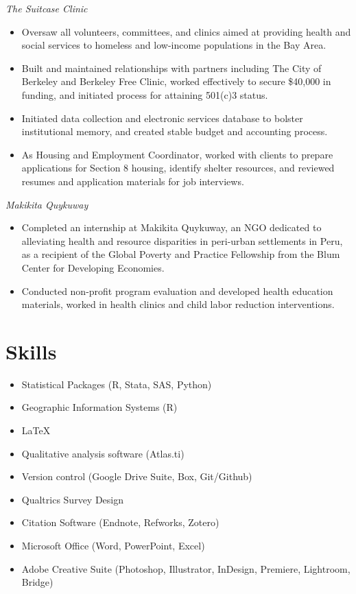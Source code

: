 \documentclass{cv_style}
\begin{document}
\textit{The Suitcase Clinic}
\begin{itemize}
    \item Oversaw all volunteers, committees, and clinics aimed at providing health and social services to homeless and low-income populations in the Bay Area.
    \item \parskip 1pt Built and maintained relationships with partners including The City of Berkeley and Berkeley Free Clinic, worked effectively to secure \$40,000 in funding, and initiated process for attaining 501(c)3 status.
    \item \parskip 1pt Initiated data collection and electronic services database to bolster institutional memory, and created stable budget and accounting process.
    \item \parskip 1pt As Housing and Employment Coordinator, worked with clients to prepare applications for Section 8 housing, identify shelter resources, and reviewed resumes and application materials for job interviews. 
\end{itemize}


\textit{Makikita Quykuway}
\begin{itemize}
    \item Completed an internship at Makikita Quykuway, an NGO dedicated to alleviating health and resource disparities in peri-urban settlements in Peru, as a recipient of the Global Poverty and Practice Fellowship from the Blum Center for Developing Economies.
    \item \parskip 1pt Conducted non-profit program evaluation and developed health education materials, worked in health clinics and child labor reduction interventions.
\end{itemize}

\section{Skills}
\begin{itemize}
    \item Statistical Packages (R, Stata, SAS, Python)
    \item \parskip 1pt Geographic Information Systems (R)
    \item \parskip 1pt \LaTeX
    \item \parskip 1pt Qualitative analysis software (Atlas.ti)
    \item \parskip 1pt Version control (Google Drive Suite, Box, Git/Github)
    \item \parskip 1pt Qualtrics Survey Design
    \item \parskip 1pt Citation Software (Endnote, Refworks, Zotero)
    \item \parskip 1pt Microsoft Office (Word, PowerPoint, Excel)
    \item \parskip 1pt Adobe Creative Suite (Photoshop, Illustrator, InDesign, Premiere, Lightroom, Bridge)
\end{itemize}
\end{document}

